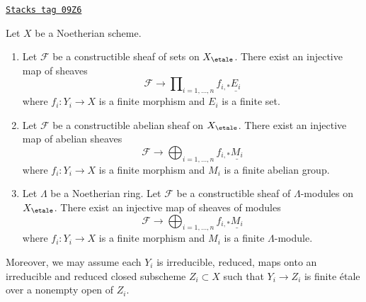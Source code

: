 \begin{lemma}
\label{etale-cohomology-lemma-constructible-maps-into-constant}
\href{https://stacks.math.columbia.edu/tag/09Z6}{\texttt{Stacks tag 09Z6}}

Let $X$ be a Noetherian scheme.
\begin{enumerate}
\item Let $\mathcal{F}$ be a constructible sheaf of sets on $X_\etale$.
There exist an injective map of sheaves
$$
\mathcal{F} \longrightarrow
\prod\nolimits_{i = 1, \ldots, n} f_{i, *}\underline{E_i}
$$
where $f_i : Y_i \to X$ is a finite morphism and $E_i$ is a finite set.
\item Let $\mathcal{F}$ be a constructible abelian sheaf on $X_\etale$.
There exist an injective map of abelian sheaves
$$
\mathcal{F} \longrightarrow
\bigoplus\nolimits_{i = 1, \ldots, n} f_{i, *}\underline{M_i}
$$
where $f_i : Y_i \to X$ is a finite morphism and
$M_i$ is a finite abelian group.
\item Let $\Lambda$ be a Noetherian ring.
Let $\mathcal{F}$ be a constructible sheaf of $\Lambda$-modules on $X_\etale$.
There exist an injective map of sheaves of modules
$$
\mathcal{F} \longrightarrow
\bigoplus\nolimits_{i = 1, \ldots, n} f_{i, *}\underline{M_i}
$$
where $f_i : Y_i \to X$ is a finite morphism and
$M_i$ is a finite $\Lambda$-module.
\end{enumerate}
Moreover, we may assume each $Y_i$ is irreducible, reduced, maps onto
an irreducible and reduced closed subscheme $Z_i \subset X$ such that
$Y_i \to Z_i$ is finite \'etale over a nonempty open of $Z_i$.
\end{lemma}

